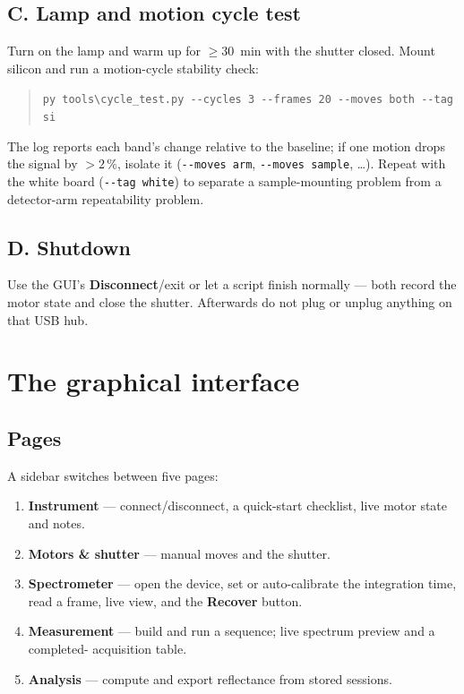 \documentclass[11pt]{article}
\newcommand{\code}[1]{\texttt{\small #1}}
\begin{document}
\subsection{C. Lamp and motion cycle test}
Turn on the lamp and warm up for $\ge 30$~min with the shutter closed. Mount silicon and run a
motion-cycle stability check:
\begin{quote}\code{py tools\textbackslash cycle\_test.py -{}-cycles 3 -{}-frames 20 -{}-moves both -{}-tag si}\end{quote}
The log reports each band's change relative to the baseline; if one motion drops the signal by
$>2\,\%$, isolate it (\code{-{}-moves arm}, \code{-{}-moves sample}, \dots). Repeat with the white
board (\code{-{}-tag white}) to separate a sample-mounting problem from a detector-arm repeatability
problem.

\subsection{D. Shutdown}
Use the GUI's \textbf{Disconnect}/exit or let a script finish normally --- both record the motor state
and close the shutter. Afterwards do not plug or unplug anything on that USB hub.

\section{The graphical interface}

\subsection{Pages}
A sidebar switches between five pages:
\begin{enumerate}
\item \textbf{Instrument} --- connect/disconnect, a quick-start checklist, live motor state and notes.
\item \textbf{Motors \& shutter} --- manual moves and the shutter.
\item \textbf{Spectrometer} --- open the device, set or auto-calibrate the integration time, read a
frame, live view, and the \textbf{Recover} button.
\item \textbf{Measurement} --- build and run a sequence; live spectrum preview and a completed-
acquisition table.
\item \textbf{Analysis} --- compute and export reflectance from stored sessions.
\end{enumerate}
\end{document}
